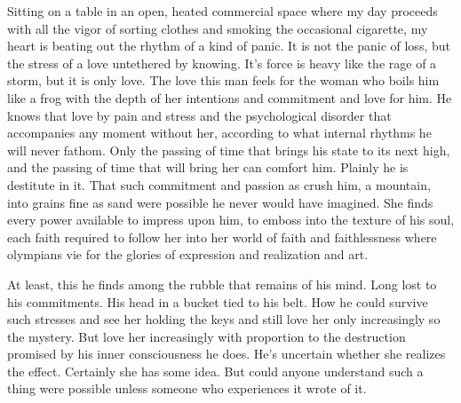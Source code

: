 

Sitting on a table in an open, heated commercial space where my day
proceeds with all the vigor of sorting clothes and smoking the
occasional cigarette, my heart is beating out the rhythm of a kind of
panic.  It is not the panic of loss, but the stress of a love
untethered by knowing.  It's force is heavy like the rage of a storm,
but it is only love.  The love this man feels for the woman who boils
him like a frog with the depth of her intentions and commitment and
love for him.  He knows that love by pain and stress and the
psychological disorder that accompanies any moment without her,
according to what internal rhythms he will never fathom.  Only the
passing of time that brings his state to its next high, and the
passing of time that will bring her can comfort him.  Plainly he is
destitute in it.  That such commitment and passion as crush him, a
mountain, into grains fine as sand were possible he never would have
imagined.  She finds every power available to impress upon him, to
emboss into the texture of his soul, each faith required to follow her
into her world of faith and faithlessness where olympians vie for the
glories of expression and realization and art.

At least, this he finds among the rubble that remains of his mind.
Long lost to his commitments.  His head in a bucket tied to his belt.
How he could survive such stresses and see her holding the keys and
still love her only increasingly so the mystery.  But love her
increasingly with proportion to the destruction promised by his inner
consciousness he does.  He's uncertain whether she realizes the
effect.  Certainly she has some idea.  But could anyone understand
such a thing were possible unless someone who experiences it wrote of
it.

\bye

